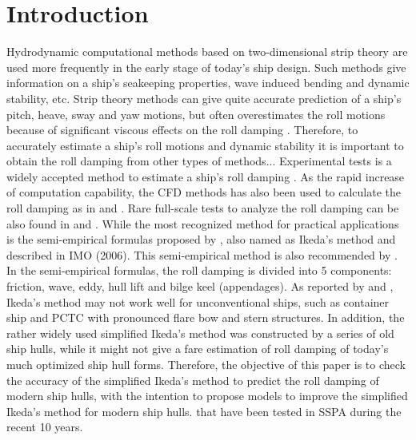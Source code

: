 \section{Introduction}
\label{se:introduction}

%    

Hydrodynamic computational methods based on two-dimensional strip theory   are used more frequently in the early stage of today's ship design. Such methods give information on a ship's seakeeping properties, wave induced bending and dynamic stability, etc. Strip theory methods can give quite accurate prediction of a ship's pitch, heave, sway and yaw motions, but often overestimates the roll motions because of significant viscous effects on the roll damping \parencite{kawahara_simple_2011}. Therefore, to accurately estimate a ship's roll motions and dynamic stability it is important to obtain the roll damping from other types of methods... Experimental tests is a widely accepted method to estimate a ship's roll damping \parencite{imo_1200_2006}. As the rapid increase of computation capability, the CFD methods has also been used to calculate the roll damping as in \parencite{kristiansen_experimental_2014} and \parencite{henry_peter_piehl_ship_2016}. Rare full-scale tests to analyze the roll damping can be also found in \parencite{schmitke_ship_1978} and \parencite{soder_assessment_2019}. While the most recognized method for practical applications is the semi-empirical formulas proposed by  \parencite{ikeda_eddy_1978,ikeda_components_1978,ikeda_roll_1979,ikeda_velocity_1979}, also named as Ikeda's method and described in IMO (2006). This semi-empirical method is also recommended by \parencite{ittc_ittc_2011}. In the semi-empirical formulas, the roll damping is divided into 5 components: friction, wave, eddy, hull lift and bilge keel (appendages). As reported by  \parencite{kawahara_simple_2011} and \parencite{soder_ikeda_2019}, Ikeda's method may not work well for unconventional ships, such as container ship and PCTC with pronounced flare bow and stern structures. In addition, the rather widely used simplified Ikeda's method \parencite{kawahara_simple_2011} was constructed by a series of old ship hulls, while it might not give a fare estimation of roll damping of today's much optimized ship hull forms. 
Therefore, the objective of this paper is to check the accuracy of the simplified Ikeda's method to predict the roll damping of modern ship hulls, with the intention to propose models to improve the simplified Ikeda's method for  modern ship hulls.  that have been tested in SSPA during the recent 10 years.


